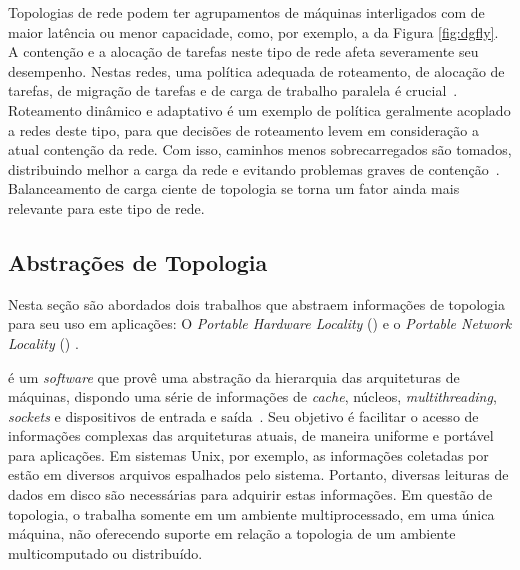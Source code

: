 Topologias de rede podem ter agrupamentos de máquinas interligados com \links de maior latência ou menor capacidade, como, por exemplo, a \dgfly da Figura \ref{fig:dgfly}.
A contenção e a alocação de tarefas neste tipo de rede afeta severamente seu desempenho.
Nestas redes, uma política adequada de roteamento, de alocação de tarefas, de migração de tarefas e de carga de trabalho paralela é crucial~\cite{dragonfly}.
Roteamento dinâmico e adaptativo é um exemplo de política geralmente acoplado a redes deste tipo, para que decisões de roteamento levem em consideração a atual contenção da rede. 
Com isso, caminhos menos sobrecarregados são tomados, distribuindo melhor a carga da rede e evitando problemas graves de contenção~\cite{kim:2008}. 
Balanceamento de carga ciente de topologia se torna um fator ainda mais relevante para este tipo de rede.


\subsection{Abstrações de Topologia}
\label{sec:abstrações}

Nesta seção são abordados dois trabalhos que abstraem informações de topologia para seu uso em aplicações: O \textit{Portable Hardware Locality} (\hwloc) \cite{broquedis:hwloc} e o \textit{Portable Network Locality}  (\netloc) \cite{Goglin:netloc}.

\Hwloc é um \textit{software} que provê uma abstração da hierarquia das arquiteturas de máquinas, dispondo uma série de informações de \textit{cache}, núcleos, \textit{multithreading}, \textit{sockets} e dispositivos de entrada e saída~\cite{broquedis:hwloc}.
Seu objetivo é facilitar o acesso de informações complexas das arquiteturas atuais, de maneira uniforme e portável para aplicações.
Em sistemas Unix, por exemplo, as informações coletadas por \hwloc estão em diversos arquivos espalhados pelo sistema. Portanto, diversas leituras de dados em disco são necessárias para adquirir estas informações.
Em questão de topologia, o \hwloc trabalha somente em um ambiente multiprocessado, em uma única máquina, não oferecendo suporte em relação a topologia de um ambiente multicomputado ou distribuído.

